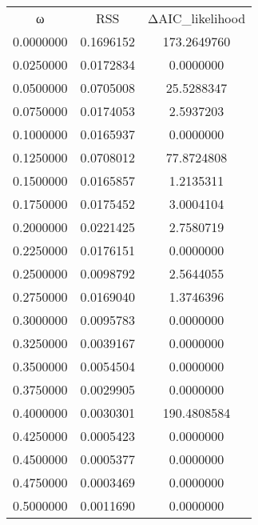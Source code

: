\begin{tabular}{ccc}
ω & RSS & ΔAIC_likelihood\\
0.0000000 & 0.1696152 & 173.2649760\\
0.0250000 & 0.0172834 & 0.0000000\\
0.0500000 & 0.0705008 & 25.5288347\\
0.0750000 & 0.0174053 & 2.5937203\\
0.1000000 & 0.0165937 & 0.0000000\\
0.1250000 & 0.0708012 & 77.8724808\\
0.1500000 & 0.0165857 & 1.2135311\\
0.1750000 & 0.0175452 & 3.0004104\\
0.2000000 & 0.0221425 & 2.7580719\\
0.2250000 & 0.0176151 & 0.0000000\\
0.2500000 & 0.0098792 & 2.5644055\\
0.2750000 & 0.0169040 & 1.3746396\\
0.3000000 & 0.0095783 & 0.0000000\\
0.3250000 & 0.0039167 & 0.0000000\\
0.3500000 & 0.0054504 & 0.0000000\\
0.3750000 & 0.0029905 & 0.0000000\\
0.4000000 & 0.0030301 & 190.4808584\\
0.4250000 & 0.0005423 & 0.0000000\\
0.4500000 & 0.0005377 & 0.0000000\\
0.4750000 & 0.0003469 & 0.0000000\\
0.5000000 & 0.0011690 & 0.0000000\\
\end{tabular}
